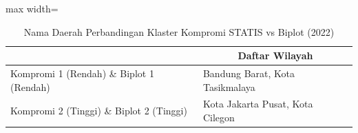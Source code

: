 \begin{table}[H]
\centering
\caption{Nama Daerah Perbandingan Klaster Kompromi STATIS vs Biplot (2022)} \label{tab:sample1biplot_comp_name_2022}
\begin{adjustbox}{max width=\textwidth}
\begin{tabular}{|>{\centering\arraybackslash}p{4cm}|p{10cm}|}
\hline
\multicolumn{1}{|c|}{\textbf{Kategori}} & \multicolumn{1}{c|}{\textbf{Daftar Wilayah}} \\
\hline
Kompromi 1 (Rendah) \& Biplot 1 (Rendah) & Bandung Barat, Kota Tasikmalaya \\
\hline
Kompromi 2 (Tinggi) \& Biplot 2 (Tinggi) & Kota Jakarta Pusat, Kota Cilegon \\
\hline
\end{tabular}
\end{adjustbox}
\end{table}